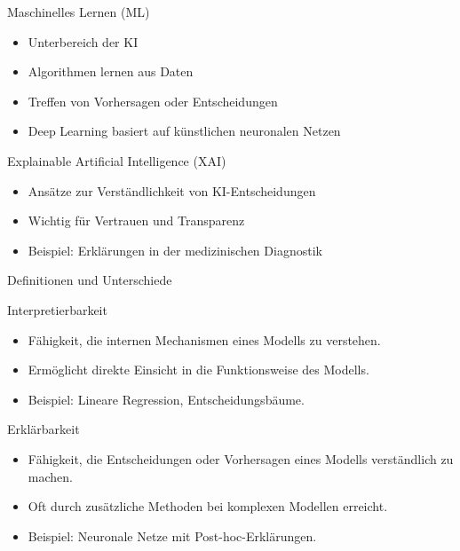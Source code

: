 \documentclass[aspectratio=1610, xcolor=dvipsnames, 9pt]{beamer}
\begin{document}
\begin{frame}{Maschinelles Lernen (ML)}
    \begin{itemize}
        \item Unterbereich der KI \newline
        \item Algorithmen lernen aus Daten \newline
        \item Treffen von Vorhersagen oder Entscheidungen \newline
        \item Deep Learning basiert auf künstlichen neuronalen Netzen
    \end{itemize}
\end{frame}

\begin{frame}{Explainable Artificial Intelligence (XAI)}
    \begin{itemize}
        \item Ansätze zur Verständlichkeit von KI-Entscheidungen \newline
        \item Wichtig für Vertrauen und Transparenz \newline
        \item Beispiel: Erklärungen in der medizinischen Diagnostik
    \end{itemize}
\end{frame}

\begin{frame}{Definitionen und Unterschiede}
    \begin{block}{Interpretierbarkeit}
        \begin{itemize}
            \item Fähigkeit, die internen Mechanismen eines Modells zu verstehen. 
            \item Ermöglicht direkte Einsicht in die Funktionsweise des Modells.
            \item Beispiel: Lineare Regression, Entscheidungsbäume.
        \end{itemize}
    \end{block}
    \begin{block}{Erklärbarkeit}
        \begin{itemize}
            \item Fähigkeit, die Entscheidungen oder Vorhersagen eines Modells verständlich zu machen.
            \item Oft durch zusätzliche Methoden bei komplexen Modellen erreicht.
            \item Beispiel: Neuronale Netze mit Post-hoc-Erklärungen.
        \end{itemize}
    \end{block}
\end{frame}
\end{document}

